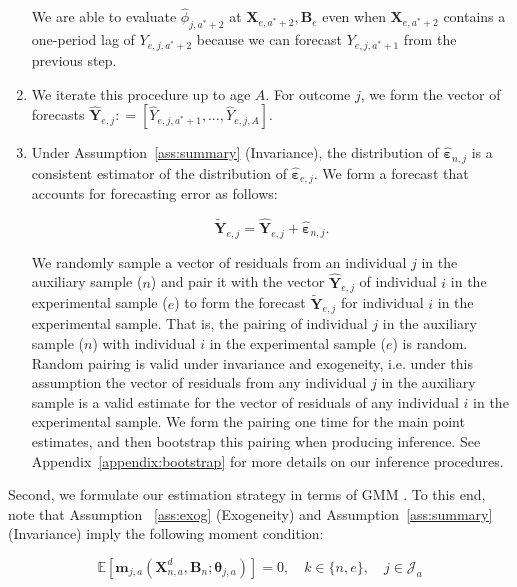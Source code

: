 \begin{enumerate}
\noindent We are able to evaluate $\hat{\phi}_{j,a^*+2}$ at $ \bm{X}_{e,a^*+2}, \bm{B}_e $ even when $\bm{X}_{e,a^*+2}$ contains a one-period lag of $Y_{e,j,a^*+2}$ because we can forecast $Y_{e,j,a^*+1}$ from the previous step.

\item We iterate this procedure up to age $A$. For outcome $j$, we form the vector of forecasts $\hat{\bm{Y}}_{e,j} : = \left[ \hat{Y}_{e,j,a^*+1}, \ldots,  \hat{Y}_{e,j,A} \right]$.

\item Under Assumption~\ref{ass:summary} (Invariance), the distribution of $\hat{\bm{\varepsilon}}_{n,j}$ is a consistent estimator of the distribution of $\hat{\bm{\varepsilon}}_{e,j}$. We form a forecast that accounts for forecasting error as follows:

\begin{equation}
\tilde{\bm{Y}}_{e,j} = \hat{\bm{Y}}_{e,j} + \hat{\bm{\varepsilon}}_{n,j}.
\end{equation}

\noindent We randomly sample a vector of residuals from an individual $j$ in the auxiliary sample ($n$) and pair it with the vector $\hat{\bm{Y}}_{e,j}$ of individual $i$ in the experimental sample ($e$) to form the forecast $\tilde{\bm{Y}}_{e,j}$ for individual $i$ in the experimental sample. That is, the pairing of individual $j$ in the auxiliary sample ($n$) with individual $i$ in the experimental sample ($e$) is random. Random pairing is valid under invariance and exogeneity, i.e. under this assumption the vector of residuals from any individual $j$ in the auxiliary sample is a valid estimate for the vector of residuals of any individual $i$ in the experimental sample. We form the pairing one time for the main point estimates, and then bootstrap this pairing when producing inference. See Appendix~\ref{appendix:bootstrap} for more details on our inference procedures.
\end{enumerate}

\noindent Second, we formulate our estimation strategy in terms of GMM \citep{Hansen_1982_Econometrica}. To this end, note that Assumption ~\ref{ass:exog} (Exogeneity) and Assumption~\ref{ass:summary} (Invariance) imply the following moment condition:

\begin{equation}
\mathbb{E} \left[ \bm{m}_{j,a} \left( \bm{X}_{n,a}^d, \bm{B}_{n}; \bm{\theta}_{j,a} \right) \right] = 0,  \quad k \in \{n,e\}, \quad j \in \mathcal{J}_a \label{eq:moment}
\end{equation}

